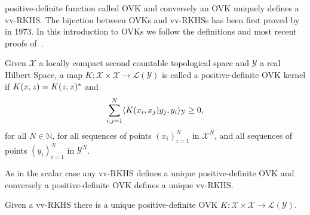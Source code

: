 \documentclass[twoside,11pt]{article}
\begin{document}
po\-si\-ti\-ve-de\-fi\-ni\-te function called \acl{OVK} and conversely an
\ac{OVK} uniquely defines a \ac{vv-RKHS}. The bijection between \acsp{OVK} and
\acsp{vv-RKHS} has been first proved by~\citet{Senkene73} in 1973. In this
introduction to \acsp{OVK} we follow the definitions and most recent proofs
of~\citet{Carmeli2010}.
\begin{definition}
    \label{def:reproducing_kernel_real} Given $\mathcal{X}$ a locally compact
    second countable topological space and $\mathcal{Y}$ a real Hilbert Space,
    a map $K:\mathcal{X}\times\mathcal{X}\to\mathcal{L}(\mathcal{Y})$ is called
    a positive-definite \acl{OVK} kernel if $K(x,z)=K(z,x)^*$ and
    \begin{dmath}
        \sum_{i,j=1}^N\inner{K(x_i,x_j)y_j,y_i}_{\mathcal{Y}}\ge 0,
    \end{dmath}
    for all $N\in\mathbb{N}$, for all sequences of points $(x_i)_{i=1}^N$ in
    $\mathcal{X}^N$, and all sequences of points  $(y_i)_{i=1}^N$ in
    $\mathcal{Y}^N$. \label{def:ovk_real}
\end{definition}
As in the scalar case any \acl{vv-RKHS} defines a unique positive-definite
\acl{OVK} and conversely a positive-definite \acl{OVK} defines a unique
\acl{vv-RKHS}.
\begin{proposition}
    \label{pr:unique_rkhs} Given a \acl{vv-RKHS} there is a unique
    positive-definite \acl{OVK}
    $K:\mathcal{X}\times\mathcal{X}\to\mathcal{L}(\mathcal{Y})$.
\end{proposition}
\end{document}
